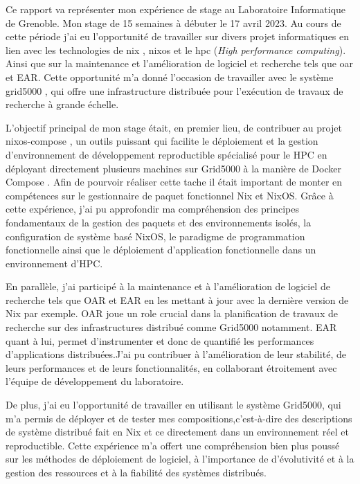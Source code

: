 \documentclass[a4paper,french,12pt, titlepage]{article}
\begin{document}
Ce rapport va représenter mon expérience de stage au Laboratoire
Informatique de Grenoble. Mon stage de 15 semaines à débuter le 17 avril
2023. Au cours de cette période j'ai eu l'opportunité de travailler sur
divers projet informatiques en lien avec les technologies de \Gls{nix}
\cite{nix2017}, \Gls{nixos} \cite{nixos2010} et le \Gls{hpc} (\emph{High
performance computing}). Ainsi que sur la maintenance et l'amélioration
de logiciel et recherche tels que \Gls{oar} \cite{oar2005} et EAR. Cette
opportunité m'a donné l'occasion de travailler avec le système
\Gls{grid5000} \cite{grid5000-2005}, qui offre une infrastructure
distribuée pour l'exécution de travaux de recherche à grande
échelle.\newline

L'objectif principal de mon stage était, en premier lieu, de contribuer
au projet \Gls{nixos-compose} \cite{nixoscompose2022}, un outils
puissant qui facilite le déploiement et la gestion d'environnement de
développement reproductible spécialisé pour le HPC en déployant
directement plusieurs machines sur Grid5000 à la manière de Docker
Compose \cite{dockercompose2021}. Afin de pourvoir réaliser cette tache
il était important de monter en compétences sur le gestionnaire de
paquet fonctionnel Nix et NixOS. Grâce à cette expérience, j'ai pu
approfondir ma compréhension des principes fondamentaux de la gestion
des paquets et des environnements isolés, la configuration de système
basé NixOS, le paradigme de programmation fonctionnelle ainsi que le
déploiement d'application fonctionnelle dans un environnement
d'HPC.\newline

En parallèle, j'ai participé à la maintenance et à l'amélioration de
logiciel de recherche tels que OAR et EAR en les mettant à jour avec la
dernière version de Nix par exemple. OAR joue un role crucial dans la
planification de travaux de recherche sur des infrastructures distribué
comme Grid5000 notamment. EAR quant à lui, permet d'instrumenter et donc
de quantifié les performances d'applications distribuées.J'ai pu
contribuer à l'amélioration de leur stabilité, de leurs performances et
de leurs fonctionnalités, en collaborant étroitement avec l'équipe de
développement du laboratoire.\newline

De plus, j'ai eu l'opportunité de travailler en utilisant le système
Grid5000, qui m'a permis de déployer et de tester mes
\glspl{composition},c'est-à-dire des descriptions de système distribué
fait en Nix et ce directement dans un environnement réel et
reproductible. Cette expérience m'a offert une compréhension bien plus
poussé sur les méthodes de déploiement de logiciel, à l'importance de
d'évolutivité et à la gestion des ressources et à la fiabilité des
systèmes distribués.\newline
\end{document}
